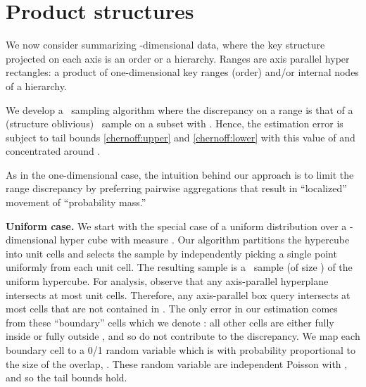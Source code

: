 \documentclass[11pt]{article}
\begin{document}


\section{Product structures} \label{product:sec}

We now consider summarizing -dimensional data, where the key structure
 projected on each axis is an order or a hierarchy. 
Ranges are axis parallel hyper rectangles: a product of one-dimensional 
key ranges (order) and/or internal nodes of a hierarchy.


We develop a \varopt\ sampling algorithm where 
the discrepancy on a range  is
that of a (structure oblivious) \varopt\ sample on a subset with 
.  
Hence, the estimation error is subject to tail bounds \eqref{chernoff:upper} and \eqref{chernoff:lower} with this value of  and 
concentrated around 
.   


As in the one-dimensional case, 
the intuition behind our approach is to limit the range discrepancy 
by preferring pairwise aggregations that result in ``localized'' 
movement of ``probability mass.''     

\medskip
\noindent
{\bf Uniform case.}
We start with the special case of a 
uniform distribution over a -dimensional hyper cube with measure .
Our algorithm partitions the hypercube into  unit cells and 
selects the sample by independently picking 
a single point uniformly from each unit cell. 
The resulting sample  is a \varopt\ sample (of size ) of the
uniform hypercube. 
 For analysis, observe that any  axis-parallel hyperplane intersects at most 
 unit cells.
Therefore, 
any axis-parallel box query  intersects at most 
 cells that are not contained in . 
The only error in our estimation comes from these 
``boundary'' cells which we denote :
all other cells are either fully inside or fully outside , and so
do not contribute to the discrepancy. 
We map each boundary cell  to a 0/1 random variable which is 
with probability proportional to the size of the overlap, .  
These random variable are independent Poisson 
with , and so
the tail bounds hold.
\end{document}

